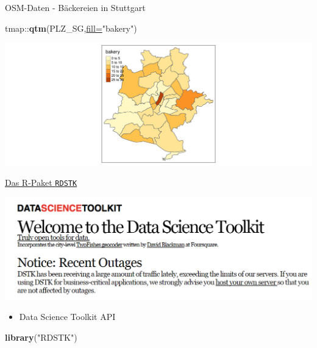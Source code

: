 \documentclass[ignorenonframetext,]{beamer}
\newenvironment{Shaded}{\begin{snugshade}}{\end{snugshade}}
\newcommand{\DataTypeTok}[1]{\textcolor[rgb]{0.74,0.68,0.62}{\underline{#1}}}
\newcommand{\KeywordTok}[1]{\textcolor[rgb]{0.26,0.66,0.93}{\textbf{#1}}}
\newcommand{\NormalTok}[1]{\textcolor[rgb]{0.74,0.68,0.62}{#1}}
\newcommand{\OperatorTok}[1]{\textcolor[rgb]{0.74,0.68,0.62}{#1}}
\newcommand{\StringTok}[1]{\textcolor[rgb]{0.02,0.61,0.04}{#1}}
\providecommand{\tightlist}{%
  \setlength{\itemsep}{0pt}\setlength{\parskip}{0pt}}
\begin{document}
\begin{frame}[fragile]{OSM-Daten - Bäckereien in Stuttgart}
\protect\hypertarget{osm-daten---backereien-in-stuttgart}{}

\begin{Shaded}
\begin{Highlighting}[]
\NormalTok{tmap}\OperatorTok{::}\KeywordTok{qtm}\NormalTok{(PLZ_SG,}\DataTypeTok{fill=}\StringTok{"bakery"}\NormalTok{)}
\end{Highlighting}
\end{Shaded}

\includegraphics{B4_Overpass_files/figure-beamer/unnamed-chunk-23-1.pdf}

\end{frame}

\begin{frame}[fragile]{\href{http://www.datasciencetoolkit.org/}{Das
R-Paket \texttt{RDSTK}}}
\protect\hypertarget{das-r-paket-rdstk}{}

\includegraphics{figure/DataScienceToolkit.PNG}

\begin{itemize}
\tightlist
\item
  Data Science Toolkit API
\end{itemize}

\begin{Shaded}
\begin{Highlighting}[]
\KeywordTok{library}\NormalTok{(}\StringTok{"RDSTK"}\NormalTok{)}
\end{Highlighting}
\end{Shaded}

\end{frame}
\end{document}
